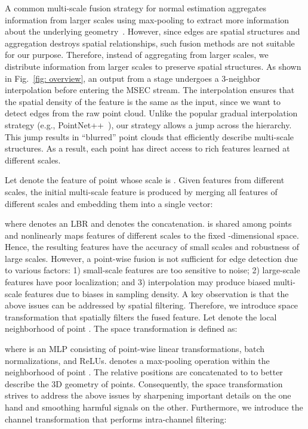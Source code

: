 \documentclass[sigconf]{acmart}
\begin{document}
A common multi-scale fusion strategy for normal estimation aggregates information from larger scales using max-pooling to extract more information about the underlying geometry~\cite{zhu2021adafit,li2022graphfit,li2022hsurf}. 
However, since edges are spatial structures and aggregation destroys spatial relationships, such fusion methods are not suitable for our purpose. 
Therefore, instead of aggregating from larger scales, we distribute information from larger scales to preserve spatial structures.  
As shown in Fig.~\ref{fig: overview}, an output from a stage undergoes a 3-neighbor interpolation before entering the MSEC stream. 
The interpolation ensures that the spatial density of the feature is the same as the input, since we want to detect edges from the raw point cloud. Unlike the popular gradual interpolation strategy (e.g., PointNet++~\cite{qi2017pointnet++}), our strategy allows a jump across the hierarchy. This jump results in ``blurred'' point clouds that efficiently describe multi-scale structures. As a result, each point has direct access to rich features learned at different scales.
  




Let  denote the feature of point  whose scale is . Given  features from different scales, the initial multi-scale feature is produced by merging all features of different scales and embedding them into a single vector: 

where  denotes an LBR and  denotes the concatenation.  is shared among points and nonlinearly maps features of different scales to the fixed -dimensional space. Hence, the resulting features have the accuracy of small scales and robustness of large scales.
However, a point-wise fusion is not sufficient for edge detection due to various factors: 1) small-scale features are too sensitive to noise; 2) large-scale features have poor localization; and 3) interpolation may produce biased multi-scale features due to biases in sampling density. 
A key observation is that the above issues can be addressed by spatial filtering.  
Therefore, we introduce space transformation that spatially filters the fused feature. Let  denote the local neighborhood of point . The space transformation is defined as: 

where  is an MLP consisting of point-wise linear transformations, batch normalizations, and ReLUs.  denotes a max-pooling operation within the neighborhood of point . The relative positions are concatenated to  to better describe the 3D geometry of points. Consequently, the space transformation strives to address the above issues by sharpening important details on the one hand and smoothing harmful signals on the other. 
Furthermore, we introduce the channel transformation that performs intra-channel filtering:
\end{document}
